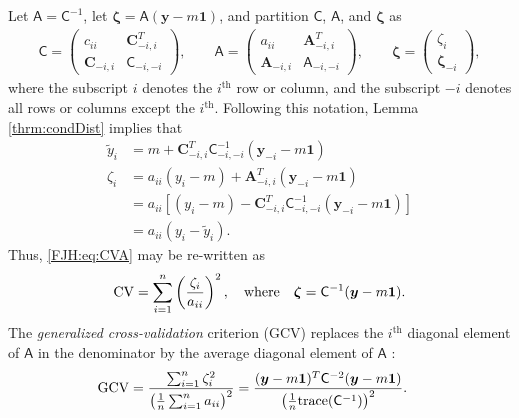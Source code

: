 \documentclass{iitthesis}          %
\newcommand{\bm}[1]{\boldsymbol{#1}}
\newcommand{\trace}[1]{\textup{trace}{#1}}
\newcommand{\vzeta}{{\bm{\zeta}}}
\newcommand{\vA}{\bm{A}}
\newcommand{\vC}{\bm{C}}
\newcommand{\vy}{\bm{y}}
\newcommand{\vone}{\bm{1}}
\newcommand{\mA}{\mathsf{A}}
\newcommand{\mC}{\mathsf{C}}
\begin{document}
Let $\mA = \mC^{-1}$, let $\vzeta = \mA (\vy - m \vone)$, and partition $\mC$, $\mA$, and $\vzeta$ as
\begin{gather*}
\mC = \begin{pmatrix} c_{ii}  & \vC_{-i,i}^T \\  \vC_{-i,i} & \mC_{-i,-i}\end{pmatrix}, \qquad
\mA = \begin{pmatrix} a_{ii}  & \vA_{-i,i}^T \\  \vA_{-i,i} & \mA_{-i,-i}\end{pmatrix}, \qquad \vzeta = \begin{pmatrix} \zeta_i   \\  \vzeta_{-i} \end{pmatrix},
\end{gather*}
where the subscript $i$ denotes the $i^{\text{th}}$ row or column, and the subscript $-i$ denotes all rows or columns except the $i^{\text{th}}$. Following this notation, Lemma \ref{thrm:condDist} implies that 
\begin{align*}
\widetilde{y}_i & = m + \vC^T_{-i,i} \mC_{-i,-i}^{-1} (\vy_{-i} -m \vone)  \\
\zeta_i  & = a_{ii}(y_i - m) + \vA_{-i,i}^T(\vy_{-i} - m \vone) \\
& = a_{ii}[(y_i - m) - \vC^T_{-i,i} \mC_{-i,-i}^{-1} (\vy_{-i} -m \vone)] \\
& = a_{ii}(y_i - \widetilde{y}_i).
\end{align*}
Thus, \eqref{FJH:eq:CVA} may be re-written as 
\begin{equation*} %
\textup{CV} = \sum_{i=1}^n \left(\frac{\zeta_i}{a_{ii}} \right)^2, \quad 
\text{where} \quad \vzeta = \mC^{-1}(\vy - m \vone).
\end{equation*}
The \emph{generalized cross-validation} criterion (GCV) replaces the $i^{\text{th}}$ diagonal element of $\mA$ in the denominator by the average diagonal element of $\mA$ \cite{CraWah79a,GolHeaWah79a,Wah90}:
\begin{align*} 
\textup{GCV} &
= \frac{\sum_{i=1}^n\zeta_i^2}{\left(\frac 1n \sum_{i=1}^n a_{ii} \right)^2} 
= \frac{(\vy - m\vone)^T \mC^{-2} (\vy - m \vone)}{\left(\frac 1n \trace(\mC^{-1}) \right)^2}.
\end{align*}
\end{document}

